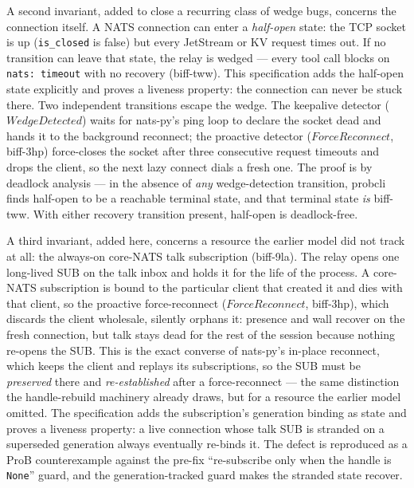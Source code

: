 \documentclass[a4paper,10pt,fleqn]{article}
\begin{document}
A second invariant, added to close a recurring class of wedge
bugs, concerns the connection itself.  A NATS connection can
enter a \emph{half-open} state: the TCP socket is up
(\texttt{is\_closed} is false) but every JetStream or KV request
times out.  If no transition can leave that state, the relay is
wedged --- every tool call blocks on \texttt{nats: timeout} with
no recovery (biff-tww).  This specification adds the half-open
state explicitly and proves a liveness property: the connection
can never be stuck there.  Two independent transitions escape the
wedge.  The keepalive detector ($WedgeDetected$) waits for
nats-py's ping loop to declare the socket dead and hands it to the
background reconnect; the proactive detector ($ForceReconnect$,
biff-3hp) force-closes the socket after three consecutive request
timeouts and drops the client, so the next lazy connect dials a
fresh one.  The proof is by deadlock analysis --- in the absence
of \emph{any} wedge-detection transition, probcli finds half-open
to be a reachable terminal state, and that terminal state
\emph{is} biff-tww.  With either recovery transition present,
half-open is deadlock-free.

A third invariant, added here, concerns a resource the earlier model
did not track at all: the always-on core-NATS talk subscription
(biff-9la).  The relay opens one long-lived SUB on the talk inbox and
holds it for the life of the process.  A core-NATS subscription is
bound to the particular client that created it and dies with that
client, so the proactive force-reconnect ($ForceReconnect$, biff-3hp),
which discards the client wholesale, silently orphans it: presence and
wall recover on the fresh connection, but talk stays dead for the rest
of the session because nothing re-opens the SUB.  This is the exact
converse of nats-py's in-place reconnect, which keeps the client and
replays its subscriptions, so the SUB must be \emph{preserved} there
and \emph{re-established} after a force-reconnect --- the same
distinction the handle-rebuild machinery already draws, but for a
resource the earlier model omitted.  The specification adds the
subscription's generation binding as state and proves a liveness
property: a live connection whose talk SUB is stranded on a superseded
generation always eventually re-binds it.  The defect is reproduced as
a ProB counterexample against the pre-fix ``re-subscribe only when the
handle is \texttt{None}'' guard, and the generation-tracked guard makes
the stranded state recover.
\end{document}
